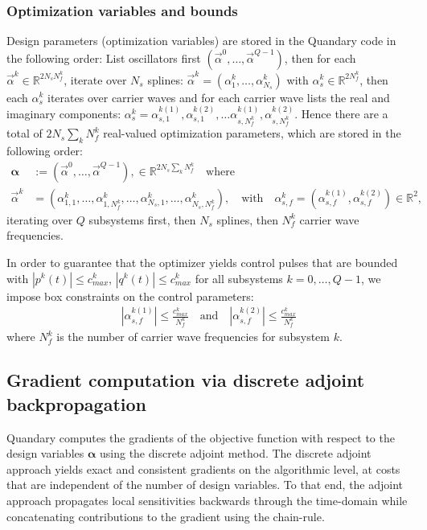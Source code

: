 \documentclass[11pt]{article}
\newcommand{\R}{\mathds{R}}
\begin{document}
\subsubsection{Optimization variables and bounds}

Design parameters (optimization variables) are stored in the Quandary code in the following order: List oscillators first $(\vec{\alpha}^0, \dots, \vec{\alpha}^{Q-1})$, then for each $\vec{\alpha}^k \in
\R^{2N_sN_f^k}$, iterate over $N_s$ splines: $\vec{\alpha}^k =
(\alpha^k_1,\dots, \alpha^k_{N_s})$ with $\alpha^k_s \in \R^{2N_f^k}$, then each
$\alpha^k_s$ iterates over carrier waves and for each carrier wave lists
the real and imaginary components: $\alpha^k_s = \alpha^{k(1)}_{s,1}, \alpha^{k(2)}_{s,1},
\dots \alpha^{k(1)}_{s,N_f^k}, \alpha^{k(2)}_{s,N_f^k}$. Hence there are a total of $2N_s\sum_k N_f^k$ real-valued optimization parameters, which are stored in the following order:
  \begin{align}
    \boldsymbol{\alpha} &:= \left( \vec{\alpha}^0, \dots, \vec{\alpha}^{Q-1} \right), \in
    \mathds{R}^{2N_s\sum_k N_f^k} \quad \text{where}\\
    \vec{\alpha}^k &= \left( \alpha_{1,1}^k,\dots, \alpha_{1,N_f^k}^k, \dots,
    \alpha_{N_s,1}^{k}, \dots, \alpha_{N_s,N_f^k}^k \right), \quad \text{with} \quad
    \alpha_{s,f}^k = \left(\alpha_{s,f}^{k(1)}, \alpha_{s,f}^{k(2)} \right) \in
    \R^2,
  \end{align}
  iterating over $Q$ subsystems first, then $N_s$ splines, then $N_f^k$ carrier wave
  frequencies. 

  In order to guarantee that the optimizer yields control pulses that are
  bounded with $|p^k(t)| \leq c^k_{max}$, $|q^k(t)| \leq c^k_{max}$ for all
  subsystems $k=0,\dots, Q-1$, we impose box constraints on the control
  parameters:
   \begin{align}
     | \alpha_{s,f}^{k(1)}| \leq \frac{c^k_{max}}{N_f^k} \quad \text{and} \quad |
     \alpha_{s,f}^{k(2)} | \leq \frac{c^k_{max}}{N_f^k}
   \end{align}
   where $N_f^k$ is the number of carrier wave frequencies for subsystem $k$. 

  
  \subsection{Gradient computation via discrete adjoint backpropagation}
   Quandary computes the gradients of the objective function with respect to the design variables $\boldsymbol{\alpha}$ using the discrete adjoint method. The discrete adjoint approach yields exact and consistent gradients on the algorithmic level, at costs that are independent of the number of design variables.    
   To that end, the adjoint approach propagates local sensitivities backwards through the time-domain while concatenating contributions to the gradient using the chain-rule.
\end{document}
